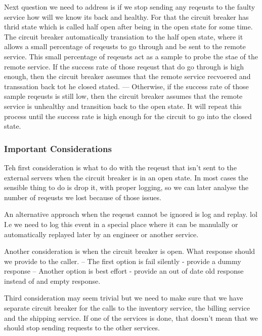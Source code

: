 \documentclass[a4paper, 11pt]{book}
\begin{document}
    Next question we need to address is if we stop sending any reqeusts to the faulty service how will we know its back and healthy.
    For that the circuit breaker has thrid state which is called half open after being in the open state for some time.
    The circuit breaker automatically transiation to the half open state, where it allows a small percentage of reqeusts to go through and be sent to the remote service.
    This small percentage of reqeusts act as a sample to probe the stae of the remote service.
    If the success rate of those reqeust that do go through is high enough, then the circuit breaker assumes that the remote service recvoered and transsation back tot he closed stated.
    --- Otherwise, if the success rate of those sample reqeusts is still low, then the circuit breaker assumes that the remote service is unhealthy and transition back to the open state.
    It will repeat this process until the success rate is high enough for the circuit to go into the closed state.

    \subsubsection{Important Considerations}
    Teh first consideration is what to do with the reqeust that isn't sent to the external servers when the circuit breaker is in an open state.
    In most cases the sensible thing to do is drop it, with proper logging, so we can later analyse the number of reqeusts we lost because of those issues.

    An alternative approach when the reqeust cannot be ignored is log and replay. lol
    I.e we need to log this event in a special place where it can be manulally or automatically replayed later by an engineer or another service.

    Another consideration is when the circuit breaker is open.
    What response should we provide to the caller.
    -- The first option is fail silently - provide a dummy response
    -- Another option is best effort - provide an out of date old response instead of and empty response.

    Third consideration may seem trivial but we need to make sure that we have separate circuit breaker for the calls to the inventory service, the billing service and the shipping service.
    If one of the services is done, that doesn't mean that we should stop sending requests to the other services.
\end{document}
